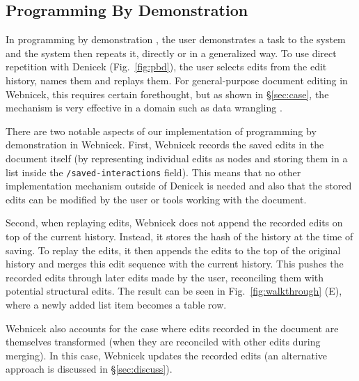 \documentclass[sigconf]{acmart}
\begin{document}

\subsection{Programming By Demonstration}
\label{sec:impl-pbd}

In programming by demonstration \cite{cypher-1993-pbd}, the user demonstrates a task to the
system and the system then repeats it, directly or in a generalized way. To use direct
repetition with Denicek (Fig.~\ref{fig:pbd}), the user selects edits from the edit history,
names them and replays them. For general-purpose document editing in Webnicek, this requires
certain forethought, but as shown in \S\ref{sec:case}, the mechanism is very effective
in a domain such as data wrangling \cite{kandel-2011-wrangler}.

There are two notable aspects of our implementation of programming by demonstration in Webnicek.
First, Webnicek records the saved edits in the document itself (by representing individual edits
as nodes and storing them in a list inside the {\small\texttt{/saved-interactions}} field).
This means that no other implementation mechanism outside of Denicek is needed and also
that the stored edits can be modified by the user or tools working with the document.

Second, when replaying edits, Webnicek does not append the recorded edits on top of the current
history. Instead, it stores the hash of the history at the time of saving. To replay the edits,
it then appends the edits to the top of the original history and merges this edit sequence
with the current history. This pushes the recorded edits through later edits made by the user,
reconciling them with potential structural edits. The result can be seen in Fig.~\ref{fig:walkthrough} (E), where
a newly added list item becomes a table row.

Webnicek also accounts for the case where edits recorded in the document are themselves
transformed (when they are reconciled with other edits during merging). In this case, Webnicek
updates the recorded edits (an alternative approach is discussed in \S\ref{sec:discuss}).

\end{document}
